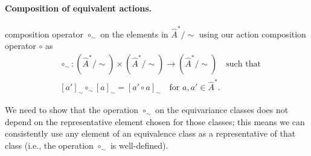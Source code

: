 \paragraph{Composition of equivalent actions.}
 composition operator $\circ_{\sim}$ on the elements in $\hat{A}^{*}/\sim$ using our action composition operator $\circ$ as
\begin{equation}
	\begin{aligned}
		 & \circ_{\sim}: (\hat{A}^{*}/\sim) \times (\hat{A}^{*}/\sim) \to (\hat{A}^{*}/\sim) \quad \text{such that} \\
		 & [a']_{\sim} \circ_{\sim} [a]_{\sim} = [a' \circ a]_{\sim} \quad \text{for $a,a' \in \hat{A}^{*}$}.
	\end{aligned}
\end{equation}

We need to show that the operation $\circ_{\sim}$ on the equivariance classes does not depend on the representative element chosen for those classes; this means we can consistently use any element of an equivalence class as a representative of that class (i.e., the operation $\circ_{\sim}$ is well-defined).

